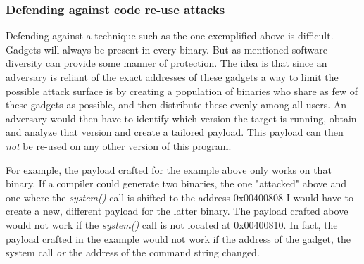 \subsubsection{Defending against code re-use attacks}

Defending against a technique such as the one exemplified above is difficult. Gadgets will
always be present in every binary. But as mentioned software diversity can provide some
manner of protection. The idea is that since an adversary is reliant of the exact
addresses of these gadgets a way to limit the possible attack surface is by creating a
population of binaries who share as few of these gadgets as possible, and then distribute
these evenly among all users. An adversary would then have to identify which version the
target is running, obtain and analyze that version and create a tailored payload. This
payload can then \textit{not} be re-used on any other version of this program.

For example, the payload crafted for the example above only works on that binary. If a
compiler could generate two binaries, the one "attacked" above and one where the
\textit{system()} call is shifted to the address 0x00400808 I would have to create a new,
different payload for the latter binary. The payload crafted above would not work if
the \textit{system()} call is not located at 0x00400810. In fact, the payload crafted in
the example would not work if the address of the gadget, the system call \textit{or} the
address of the command string changed.
